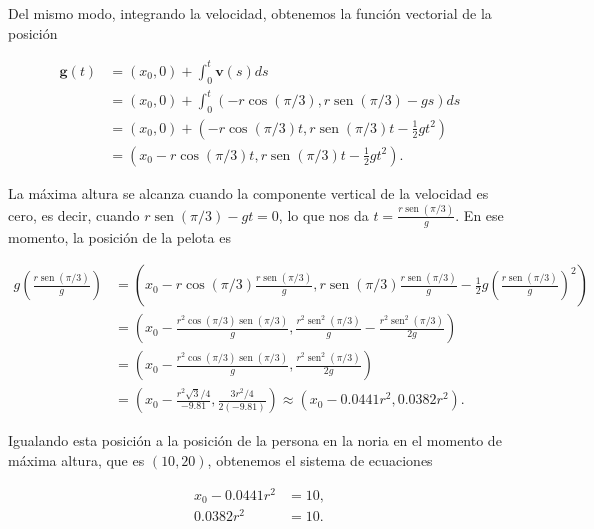 \documentclass[
  spanish,
  a4paper,
]{scrreport}
\theoremstyle{definition}
\theoremstyle{remark}
\begin{document}
\begin{tcolorbox}
\begin{enumerate}
  Del mismo modo, integrando la velocidad, obtenemos la función
  vectorial de la posición

  \begin{align*}
  \mathbf{g}(t) &= (x_0, 0) + \int_0^t \mathbf{v}(s) ds \\
  &= (x_0, 0) + \int_0^t (-r\cos(\pi/3), r\operatorname{sen}(\pi/3) - gs) ds \\
  &= (x_0, 0) + (-r\cos(\pi/3)t, r\operatorname{sen}(\pi/3)t - \frac{1}{2}gt^2) \\
  &= (x_0 - r\cos(\pi/3)t, r\operatorname{sen}(\pi/3)t - \frac{1}{2}gt^2).
  \end{align*}

  La máxima altura se alcanza cuando la componente vertical de la
  velocidad es cero, es decir, cuando
  \(r\operatorname{sen}(\pi/3) - gt = 0\), lo que nos da
  \(t = \frac{r\operatorname{sen}(\pi/3)}{g}\). En ese momento, la
  posición de la pelota es

  \begin{align*}
  g\left(\frac{r\operatorname{sen}(\pi/3)}{g}\right) 
  &= (x_0 - r\cos(\pi/3)\frac{r\operatorname{sen}(\pi/3)}{g}, r\operatorname{sen}(\pi/3)\frac{r\operatorname{sen}(\pi/3)}{g} - \frac{1}{2}g\left(\frac{r\operatorname{sen}(\pi/3)}{g}\right)^2) \\
  &= \left(x_0 - \frac{r^2\cos(\pi/3)\operatorname{sen}(\pi/3)}{g}, \frac{r^2\operatorname{sen}^2(\pi/3)}{g} - \frac{r^2\operatorname{sen}^2(\pi/3)}{2g}\right) \\
  &= \left(x_0 - \frac{r^2\cos(\pi/3)\operatorname{sen}(\pi/3)}{g}, \frac{r^2\operatorname{sen}^2(\pi/3)}{2g}\right) \\
  &= \left(x_0 - \frac{r^2\sqrt{3}/4}{-9.81}, \frac{3r^2/4}{2(-9.81)}\right) 
  \approx \left(x_0 - 0.0441 r^2, 0.0382 r^2\right). 
  \end{align*}

  Igualando esta posición a la posición de la persona en la noria en el
  momento de máxima altura, que es \((10, 20)\), obtenemos el sistema de
  ecuaciones

  \begin{align*}
  x_0 - 0.0441 r^2 &= 10, \\
  0.0382 r^2 &= 10.
  \end{align*}


\end{enumerate}
\end{tcolorbox}
\end{document}

